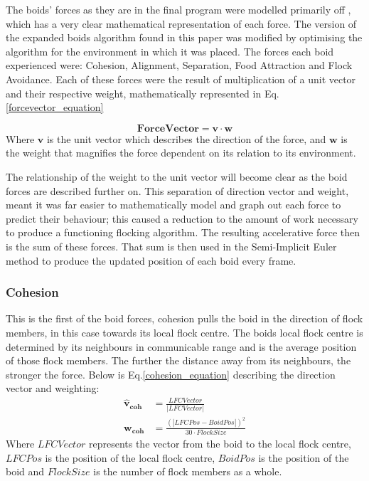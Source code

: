 The boids' forces as they are in the final program were modelled primarily off \citet{4604156}, which has a very clear mathematical representation of each force. The version of the expanded boids algorithm found in this paper was modified by optimising the algorithm for the environment in which it was placed. The forces each boid experienced were: Cohesion, Alignment, Separation, Food Attraction and Flock Avoidance. Each of these forces were the result of multiplication of a unit vector and their respective weight, mathematically represented in Eq.\ref{forcevector_equation}

\begin{equation}
\boldsymbol{Force Vector} = \boldsymbol{v} \cdot \boldsymbol{w}
\label{forcevector_equation}
\end{equation}
Where $\boldsymbol{v}$ is the unit vector which describes the direction of the force, and $\boldsymbol{w}$ is the weight that magnifies the force dependent on its relation to its environment.

The relationship of the weight to the unit vector will become clear as the boid forces are described further on. This separation of direction vector and weight, meant it was far easier to mathematically model and graph out each force to predict their behaviour; this caused a reduction to the amount of work necessary to produce a functioning flocking algorithm. The resulting accelerative force then is the sum of these forces. That sum is then used in the Semi-Implicit Euler method to produce the updated position of each boid every frame.

\subsubsection{Cohesion} 
This is the first of the boid forces, cohesion pulls the boid in the direction of flock members, in this case towards its local flock centre. The boids local flock centre is determined by its neighbours in communicable range and is the average position of those flock members. The further the distance away from its neighbours, the stronger the force. Below is Eq.\ref{cohesion_equation} describing the direction vector and weighting:
\begin{equation}
\begin{split}
	\boldsymbol{\hat{v}_{coh}} &= \frac{ LFCVector} {|LFCVector|} \\
	\boldsymbol{w_{coh}} &= \frac{(|LFCPos - BoidPos|)^2} {30 \cdot FlockSize}
\end{split}
\label{cohesion_equation}
\end{equation}
Where $LFCVector$ represents the vector from the boid to the local flock centre, $LFCPos$ is the position of the local flock centre, $BoidPos$ is the position of the boid and $FlockSize$ is the number of flock members as a whole.

